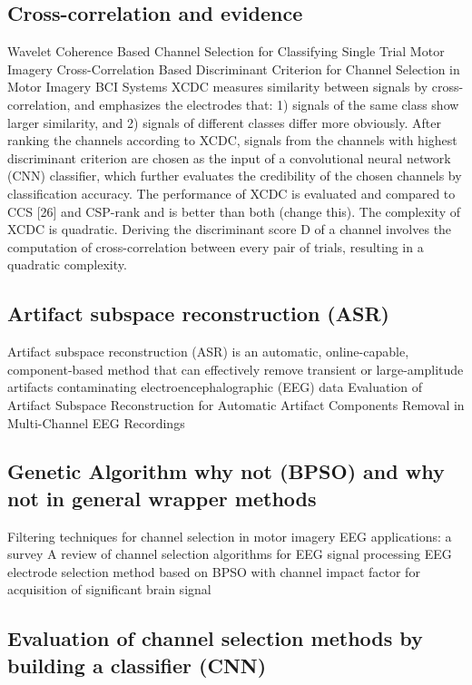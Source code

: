 \documentclass{Configuration_Files/PoliMi3i_thesis}
\begin{document}
\subsection{Cross-correlation and evidence}
{Wavelet Coherence Based Channel Selection for Classifying Single Trial Motor Imagery}
{Cross-Correlation Based Discriminant Criterion for
Channel Selection in Motor Imagery BCI Systems}
XCDC measures similarity between signals by
cross-correlation, and emphasizes the electrodes that:
1) signals of the same class show larger similarity, and
2) signals of different classes differ more obviously.
After ranking the channels according to XCDC, signals
from the channels with highest discriminant criterion
are chosen as the input of a convolutional neural
network (CNN) classifier, which further evaluates the
credibility of the chosen channels by classification
accuracy. The performance of XCDC is evaluated
and compared to CCS [26] and CSP-rank and is better than both (change this).
The complexity of XCDC is quadratic. Deriving
the discriminant score D of a channel involves the
computation of cross-correlation between every pair of
trials, resulting in a quadratic complexity.


\subsection{Artifact subspace reconstruction (ASR)}
Artifact subspace reconstruction (ASR) is an automatic, online-capable, component-based method that can effectively remove transient or large-amplitude artifacts contaminating electroencephalographic (EEG) data
{Evaluation of Artifact Subspace Reconstruction for Automatic Artifact Components Removal in Multi-Channel EEG Recordings}


\subsection{Genetic Algorithm why not (BPSO) and why not in general wrapper methods}
{Filtering techniques for channel selection in motor imagery EEG applications: a survey}
{A review of channel selection algorithms for EEG signal processing}
{EEG electrode selection method based on BPSO with channel impact factor for acquisition of significant brain signal}

\subsection{Evaluation of channel selection methods by building a classifier (CNN)}
\end{document}
